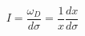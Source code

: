 \begin{equation}\label{DInv}
 I=\frac{\omega_{D}}{d\sigma}=\frac{1}{x}\frac{d x}{d\sigma}
\end{equation}

